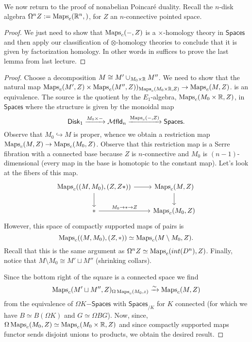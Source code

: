 \documentclass{amsart}
\begin{document}
We now return to the proof of nonabelian Poincar\'e duality. Recall the $n$-disk algebra
$\Omega^nZ:=\operatorname{Maps}_c(\mathbb{R}^n,)$, for $Z$ an $n$-connective pointed space.
\begin{proof}
    We just need to show that $\operatorname{Maps}_c(-,Z)$ is a $\times$-homology theory in $\mathsf{Spaces}$
    and then apply our classification of $\otimes$-homology theories to conclude that it
    is given by factorization homology. In other words in suffices to prove the
    last lemma from last lecture.
\end{proof}


\begin{proof}
    Choose a decomposition $M\cong M'\cup_{M_0\times\mathbb{R}}M''$. We need to show that
    the natural map $\operatorname{Maps}_c(M',Z)\times\operatorname{Maps}_c(M'',Z))_{\operatorname{Maps}_c(M_0\times\mathbb{R},Z)}\to\operatorname{Maps}_c(M,Z)$.
    is an equivalence. The source is the quotient by the $E_1$-algebra,
    $\operatorname{Maps}_c(M_0\times\mathbb{R}, Z)$, in $\mathsf{Spaces}$ where the structure is given by the
    monoidal map
    \begin{equation*}
        \mathsf{Disk}_1\xrightarrow{M_0\times-}\mathcal{M}\mathsf{fld}_n\xrightarrow{\operatorname{Maps}_c(-,Z)}\mathsf{Spaces}.
    \end{equation*}
    Observe that $M_0\hookrightarrow M$ is proper, whence we obtain a restriction
    map $\operatorname{Maps}_c(M,Z)\to \operatorname{Maps}_c(M_0,Z)$. Observe that this restriction map is a Serre
    fibration with a connected base because $Z$ is $n$-connective and $M_0$ is
    $(n-1)$-dimensional (every map in the base is homotopic to the constant map).
    Let's look at the fibers of this map.
    \begin{equation*}
        \begin{tikzcd}
            \Maps_c( (M,M_0),(Z,Z*)) \rar\dar & \Maps_c(M,Z)\dar \\
            *\rar{M_0\to *\to Z} & \Maps_c(M_0,Z)
        \end{tikzcd}
    \end{equation*}
    However, this space of compactly supported maps of pairs is
    \begin{equation*}
        \operatorname{Maps}_c( (M,M_0), (Z,*)) \simeq \operatorname{Maps}_c(M\setminus M_0, Z).
    \end{equation*}
    Recall that this is the same argument as $\Omega^nZ\simeq \operatorname{Maps}_c(int(D^n),Z)$.
    Finally, notice that $M\setminus M_0\cong M'\sqcup M''$ (shrinking collars).

    Since the bottom right of the square is a connected space we find
    \begin{equation*}
        \operatorname{Maps}_c(M'\sqcup M'',Z)_{\Omega\operatorname{Maps}_c(M_0,z)}\xrightarrow{\sim}\operatorname{Maps}_c(M,Z)
    \end{equation*}
    from the equivalence of $\Omega K\mathsf{-Spaces}$ with $\mathsf{Spaces}_{/K}$
    for $K$ connected (for which we have $B\simeq B(\Omega K)$ and $G\simeq \Omega BG$).
    Now, since, $\Omega\operatorname{Maps}_c(M_0,Z)\simeq\operatorname{Maps}_c(M_0\times\mathbb{R},Z)$ and since compactly
    supported maps functor sends disjoint unions to products, we obtain the
    desired result.
\end{proof}
\end{document}
